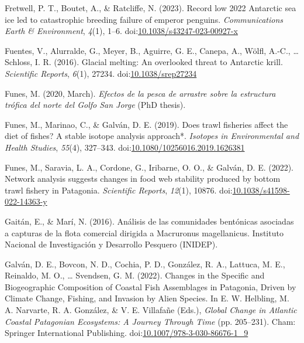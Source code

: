 \documentclass[
]{article}
\newlength{\cslhangindent}
\newenvironment{CSLReferences}[2] %
 {\begin{list}{}{%
  \setlength{\itemindent}{0pt}
  \setlength{\leftmargin}{0pt}
  \setlength{\parsep}{0pt}
  \ifodd #1
   \setlength{\leftmargin}{\cslhangindent}
   \setlength{\itemindent}{-1\cslhangindent}
  \fi
  \setlength{\itemsep}{#2\baselineskip}}}
 {\end{list}}
\begin{document}
\begin{CSLReferences}{1}{0}
Fretwell, P. T., Boutet, A., \& Ratcliffe, N. (2023). Record low 2022
{Antarctic} sea ice led to catastrophic breeding failure of emperor
penguins. \emph{Communications Earth \& Environment}, \emph{4}(1), 1--6.
doi:\href{https://doi.org/10.1038/s43247-023-00927-x}{10.1038/s43247-023-00927-x}

Fuentes, V., Alurralde, G., Meyer, B., Aguirre, G. E., Canepa, A.,
Wölfl, A.-C., \ldots{} Schloss, I. R. (2016). Glacial melting: An
overlooked threat to {Antarctic} krill. \emph{Scientific Reports},
\emph{6}(1), 27234.
doi:\href{https://doi.org/10.1038/srep27234}{10.1038/srep27234}

Funes, M. (2020, March). \emph{Efectos de la pesca de arrastre sobre la
estructura trófica del norte del {Golfo San Jorge}} (PhD thesis).

Funes, M., Marinao, C., \& Galván, D. E. (2019). Does trawl fisheries
affect the diet of fishes? {A} stable isotope analysis approach*.
\emph{Isotopes in Environmental and Health Studies}, \emph{55}(4),
327--343.
doi:\href{https://doi.org/10.1080/10256016.2019.1626381}{10.1080/10256016.2019.1626381}

Funes, M., Saravia, L. A., Cordone, G., Iribarne, O. O., \& Galván, D.
E. (2022). Network analysis suggests changes in food web stability
produced by bottom trawl fishery in {Patagonia}. \emph{Scientific
Reports}, \emph{12}(1), 10876.
doi:\href{https://doi.org/10.1038/s41598-022-14363-y}{10.1038/s41598-022-14363-y}

Gaitán, E., \& Marí, N. (2016). {Análisis de las comunidades bentónicas
asociadas a capturas de la flota comercial dirigida a Macruronus
magellanicus}. {Instituto Nacional de Investigación y Desarrollo
Pesquero (INIDEP)}.

Galván, D. E., Bovcon, N. D., Cochia, P. D., González, R. A., Lattuca,
M. E., Reinaldo, M. O., \ldots{} Svendsen, G. M. (2022). Changes in the
{Specific} and {Biogeographic Composition} of {Coastal Fish Assemblages}
in {Patagonia}, {Driven} by {Climate Change}, {Fishing}, and {Invasion}
by {Alien Species}. In E. W. Helbling, M. A. Narvarte, R. A. González,
\& V. E. Villafañe (Eds.), \emph{Global {Change} in {Atlantic Coastal
Patagonian Ecosystems}: {A Journey Through Time}} (pp. 205--231).
{Cham}: {Springer International Publishing}.
doi:\href{https://doi.org/10.1007/978-3-030-86676-1_9}{10.1007/978-3-030-86676-1\_9}


\end{CSLReferences}
\end{document}
